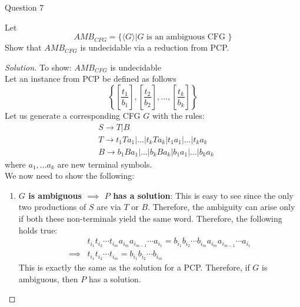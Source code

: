 \begin{solution}{Question 7}\label{ques:7}
    \begin{question}
        Let
        $$AMB_{CFG} = \{ \langle G\rangle | G \text{ is an ambiguous CFG } \}$$
        Show that $AMB_{CFG}$ is undecidable via a reduction from PCP.
    \end{question}
    \tcblower{}
    \begin{proof}[Solution]
        To show: $AMB_{CFG}$ is undecidable\\
        Let an instance from PCP be defined as follows
        \begin{equation}
        \left\{  \left[\frac{t_1}{b_1}\right], \left[\frac{t_2}{b_2}\right], \dots, \left[\frac{t_k}{b_k}\right]  \right\}
        \end{equation}
        Let us generate a corresponding CFG $G$ with the rules:
        \begin{equation}
        \begin{split}
            & S \rightarrow T|B  \\
            & T \rightarrow t_1Ta_1 |\dots|t_k T a_k|t_1 a_1|\dots|t_k a_k \\
            & B \rightarrow b_1Ba_1 |\dots|b_k B a_k|b_1 a_1|\dots|b_k a_k
        \end{split}
        \end{equation}
        where $a_1, \dots a_k$ are new terminal symbols.\\
        We now need to show the following:
        \begin{enumerate}
            \item \textbf{$G$ is ambiguous $\implies$ $P$ has a solution}: This is easy to see since the only two productions of $S$ are via $T$ or $B$. Therefore, the ambiguity can arise only if both these non-terminals yield the same word. Therefore, the following holds true:
            \begin{equation}
                \begin{split}
                    &t_{i_1}t_{i_2}\cdots t_{i_m}a_{i_m}a_{i_{m-1}}\cdots a_{i_1} = b_{i_1}b_{i_2}\cdots b_{i_m}a_{i_m}a_{i_{m-1}}\cdots a_{i_1}\\
                    \implies &t_{i_1}t_{i_2}\cdots t_{i_m} = b_{i_1}b_{i_2}\cdots b_{i_m}
                \end{split}
            \end{equation}
            This is exactly the same as the solution for a PCP. Therefore, if $G$ is ambiguous, then $P$ has a solution.

\end{enumerate}
\end{proof}
\end{solution}
